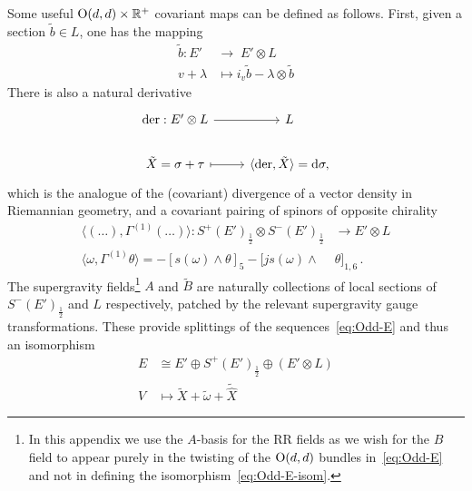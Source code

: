 \documentclass[debug]{phd}
\begin{document}
			Some useful $\mathrm{O}(d,d)\times\mathbb{R}^+$ covariant maps can be defined as follows. 
			First, given a section $\tilde{b} \in L$, one has the mapping
					\begin{equation}\label{eq:density-map}
						\begin{aligned}
							\tilde{b} : E' &\rightarrow \; E' \otimes L \\
							v + \lambda &\mapsto i_v \tilde{b} - \lambda \otimes \tilde{b}
						\end{aligned}
					\end{equation}
			There is also a natural derivative
					\begin{equation}\label{eq:d-sigma-map}
						\begin{tikzcd}
							\mathrm{der} : E' \otimes L \arrow{r}& L \\
							\tilde{X} = \sigma + \tau \arrow[mapsto]{r} & \langle \mathrm{der} , \tilde{X} \rangle = \dd \sigma ,
						\end{tikzcd}
					\end{equation}
			which is the analogue of the (covariant) divergence of a vector density in Riemannian geometry, and a covariant pairing of spinors of opposite chirality
					\begin{equation}\label{eq:Odd-spinor-bilinear}
						\begin{aligned}
							\langle (\dots), \Gamma^{(1)} (\dots) \rangle : S^+ (E')_{\frac{1}{2}} \otimes S^- (E')_{\frac{1}{2}} &\longrightarrow E' \otimes L \\
							\langle \omega , \Gamma^{(1)} \theta \rangle = - [s(\omega) \wedge \theta ]_5 - [j s(\omega)\wedge& \theta ]_{1,6}\,.
						\end{aligned}
					\end{equation}
			The supergravity fields\footnote{%
				In this appendix we use the $A$-basis for the RR fields as we wish for the $B$ field to appear purely in the twisting of the $\mathrm{O}(d,d)$ bundles in~\eqref{eq:Odd-E} and not in defining the isomorphism~\eqref{eq:Odd-E-isom}.%
				}
			$A$ and $\tilde{B}$ are naturally collections of local sections of $S^- (E')_{\frac{1}{2}}$ and $L$ respectively, patched by the relevant supergravity gauge transformations. 
			These provide splittings of the sequences~\eqref{eq:Odd-E} and thus an isomorphism 
					\begin{equation}\label{eq:Odd-E-isom}
						\begin{aligned}
							E &\cong E' \oplus S^+(E')_{\frac12} \oplus (E' \otimes L) \\
							V &\mapsto \tilde{X} + \tilde{\omega} + \tilde{\hat{X}}
						\end{aligned}
					\end{equation}
\end{document}
